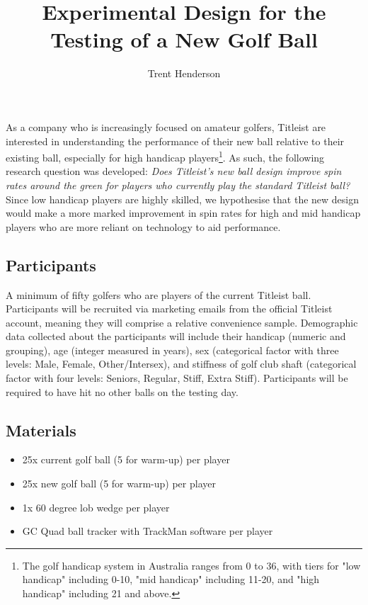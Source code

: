 \documentclass{article}
\begin{document}
\title{\vspace{-4cm}Experimental Design for the Testing of a New Golf Ball}
\author{Trent Henderson}
\date{}

\maketitle

As a company who is increasingly focused on amateur golfers, Titleist are interested in understanding the performance of their new ball relative to their existing ball, especially for high handicap players\footnote{The golf handicap system in Australia ranges from 0 to 36, with tiers for "low handicap" including 0-10, "mid handicap" including 11-20, and "high handicap" including 21 and above.}. 
As such, the following research question was developed: \textit{Does Titleist's new ball design improve spin rates around the green for players who currently play the standard Titleist ball?} 
Since low handicap players are highly skilled, we hypothesise that the new design would make a more marked improvement in spin rates for high and mid handicap players who are more reliant on technology to aid performance.

\subsection*{Participants}

A minimum of fifty golfers who are players of the current Titleist ball. 
Participants will be recruited via marketing emails from the official Titleist account, meaning they will comprise a relative convenience sample. 
Demographic data collected about the participants will include their handicap (numeric and grouping), age (integer measured in years), sex (categorical factor with three levels: Male, Female, Other/Intersex), and stiffness of golf club shaft (categorical factor with four levels: Seniors, Regular, Stiff, Extra Stiff). 
Participants will be required to have hit no other balls on the testing day.

\subsection*{Materials}

\begin{itemize}
    \item 25x current golf ball (5 for warm-up) per player
    \item 25x new golf ball (5 for warm-up) per player
    \item 1x 60 degree lob wedge per player
    \item GC Quad ball tracker with TrackMan software per player
\end{itemize}
\end{document}
